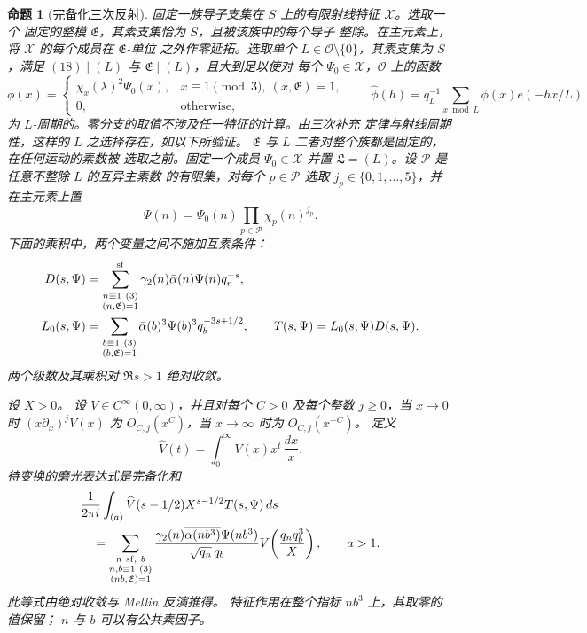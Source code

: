 \documentclass[11pt,a4paper]{article}
\numberwithin{equation}{section}
\numberwithin{figure}{section}
\newtheorem{proposition}[theorem]{命题}
\theoremstyle{definition}
\theoremstyle{remark}
\begin{document}
\begin{proposition}[完备化三次反射]
\label{prop:completed-reflection}
固定一族导子支集在 $S$ 上的有限射线特征 $\mathcal X$。选取一个
固定的整模 $\mathfrak E$，其素支集恰为 $S$，且被该族中的每个导子
整除。在主元素上，将 $\mathcal X$ 的每个成员在 $\mathfrak E$-单位
之外作零延拓。选取单个 $L\in\mathcal O\setminus\{0\}$，其素支集为
$S$，满足 $(18)\mid(L)$ 与 $\mathfrak E\mid(L)$，且大到足以使对
每个 $\Psi_0\in\mathcal X$，$\mathcal O$ 上的函数
\[
 \phi(x)=
 \begin{cases}
 \chi_x(\lambda)^2\Psi_0(x),&x\equiv1\pmod3,\ (x,\mathfrak E)=1,\\
 0,&\text{otherwise},
 \end{cases}
 \qquad
 \widehat\phi(h)=q_L^{-1}\sum_{x\bmod L}\phi(x)e(-hx/L)
\]
为 $L$-周期的。零分支的取值不涉及任一特征的计算。由三次补充
定律与射线周期性，这样的 $L$ 之选择存在，如以下所验证。
$\mathfrak E$ 与 $L$ 二者对整个族都是固定的，在任何运动的素数被
选取之前。固定一个成员 $\Psi_0\in\mathcal X$ 并置
$\mathfrak L=(L)$。设 $\mathcal P$ 是任意不整除 $L$ 的互异主素数
的有限集，对每个 $p\in\mathcal P$ 选取
$j_p\in\{0,1,\ldots,5\}$，并在主元素上置
\[
 \Psi(n)=\Psi_0(n)\prod_{p\in\mathcal P}\chi_p(n)^{j_p}.
\]
下面的乘积中，两个变量之间不施加互素条件：
\[
 \begin{split}
 D(s,\Psi)&=\sum_{\substack{n\equiv1\ (3)\\(n,\mathfrak E)=1}}^{\rm sf}
       \gamma_2(n)\bar\alpha(n)\Psi(n)q_n^{-s},\\
 L_0(s,\Psi)&=\sum_{\substack{b\equiv1\ (3)\\(b,\mathfrak E)=1}}
       \bar\alpha(b)^3\Psi(b)^3q_b^{-3s+1/2},
       \qquad T(s,\Psi)=L_0(s,\Psi)D(s,\Psi).
 \end{split}
\]
两个级数及其乘积对 $\Re s>1$ 绝对收敛。

设 $X>0$。 设 $V\in C^\infty(0,\infty)$，并且对每个
$C>0$ 及每个整数 $j\ge0$，当
$x\to0$ 时 $(x\partial_x)^jV(x)$ 为 $O_{C,j}(x^C)$，当 $x\to\infty$ 时为 $O_{C,j}(x^{-C})$。 定义
\[
 \widehat V(t)=\int_0^\infty V(x)x^t\,\frac{dx}{x}.
\]
待变换的磨光表达式是完备化和
\[
 \begin{split}
 &\frac1{2\pi i}\int_{(a)}\widehat V(s-1/2)X^{s-1/2}T(s,\Psi)\,ds\\
 &\quad=\sum_{\substack{n\ {\rm sf},\ b\\n,b\equiv1\ (3)\\(nb,\mathfrak E)=1}}
 \frac{\gamma_2(n)\overline{\alpha(nb^3)}\Psi(nb^3)}
      {\sqrt{q_n}\,q_b}
 V\!\left(\frac{q_nq_b^3}{X}\right),\qquad a>1.
 \end{split}
\]
此等式由绝对收敛与 Mellin 反演推得。
特征作用在整个指标 $nb^3$ 上，其取零的值保留；
$n$ 与 $b$ 可以有公共素因子。


\end{proposition}
\end{document}
